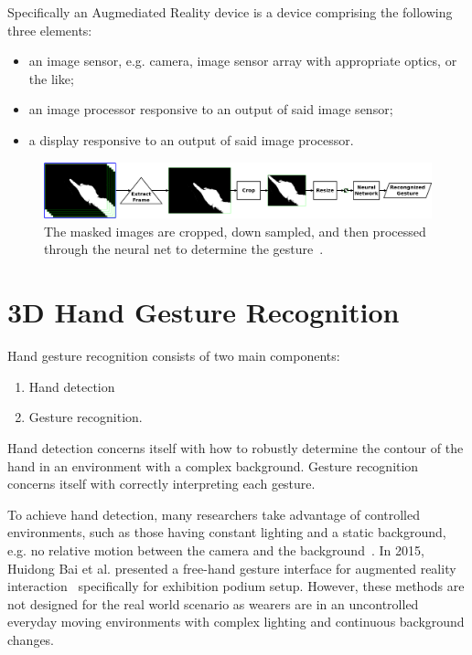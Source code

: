 Specifically an Augmediated Reality device is a device comprising the following three elements:
\begin{itemize}
 \item an image sensor, e.g. camera, image sensor array with appropriate optics,
       or the like;
 \item an image processor responsive to an output of said image sensor;
 \item a display responsive to an output of said image processor.
\end{itemize}

\begin{figure}
\centering
\includegraphics[width=\columnwidth]{ch5/figs/train_flow3.pdf}
\caption{The masked images are cropped, down sampled, and then processed through the neural net to determine the gesture~\cite{lo2013augmediated}.}
\label{flow_diagram}
\end{figure}

\section{3D Hand Gesture Recognition}
Hand gesture recognition consists of two main components:
\begin{enumerate}
    \item Hand detection
    \item Gesture recognition.
\end{enumerate}
Hand detection concerns itself with how to robustly determine the contour of the hand in an environment with a complex background. Gesture recognition concerns itself with correctly interpreting each gesture.

To achieve hand detection, many researchers take advantage of controlled environments, such as those having constant lighting and a static background, e.g. no relative motion between the camera and the
background~\cite{imagawa1998color, hong2000gesture}. In 2015, Huidong Bai et al. presented a free-hand gesture interface for augmented reality interaction~\cite{bai2015free} specifically for exhibition podium setup. However, these methods are not designed for the real world scenario as wearers are in an uncontrolled everyday moving environments with complex lighting and continuous background changes. 

